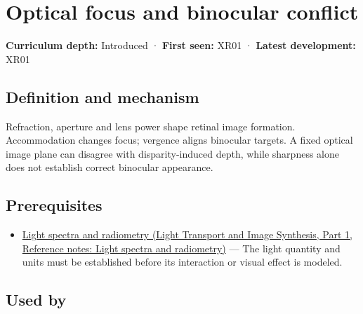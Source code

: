 \hypertarget{appendix-f90cee1be7a4}{}\label{referencestart:appendix-f90cee1be7a4}
\section{Optical focus and binocular conflict}\label{appendix-f90cee1be7a4-optical-focus-and-binocular-conflict}

\hypertarget{appendix-f90cee1be7a4-optical-focus-and-binocular-conflict}{}

\textbf{Curriculum depth:} Introduced · \textbf{First seen:} XR01 · \textbf{Latest development:} XR01

\begin{allmightroledefinition}

\subsection{Definition and mechanism}\label{appendix-f90cee1be7a4-definition-and-mechanism}

\hypertarget{appendix-f90cee1be7a4-definition-and-mechanism}{}

Refraction, aperture and lens power shape retinal image formation. Accommodation changes focus; vergence aligns binocular targets. A fixed optical image plane can disagree with disparity-induced depth, while sharpness alone does not establish correct binocular appearance.

\end{allmightroledefinition}

\subsection{Prerequisites}\label{appendix-f90cee1be7a4-prerequisites}

\hypertarget{appendix-f90cee1be7a4-prerequisites}{}

\begin{itemize}
\tightlist
\item
  \href{../04-Light-Transport-and-Image-Synthesis-P01/main.pdf\#appendix-215c2570199b}{Light spectra and radiometry (Light Transport and Image Synthesis, Part 1, Reference notes: Light spectra and radiometry)} --- The light quantity and units must be established before its interaction or visual effect is modeled.
\end{itemize}

\subsection{Used by}\label{appendix-f90cee1be7a4-used-by}

